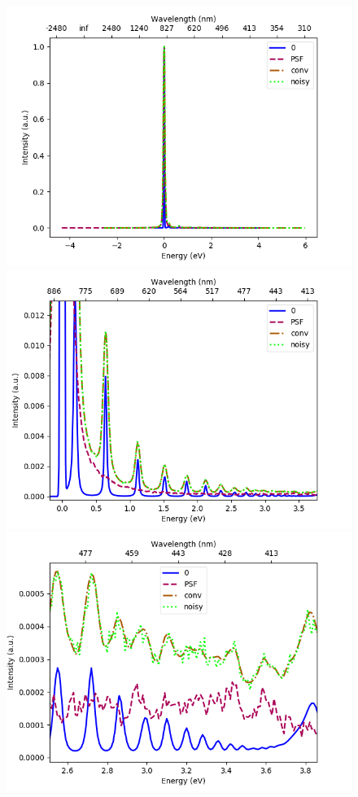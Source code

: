 \documentclass[12pt, titlepage]{article}
\begin{document}
\begin{figure}[h]
    \includegraphics[scale=0.4]{Reference_spectra.png}
    \includegraphics[scale=0.4]{Reference_spectra2.png}
    \includegraphics[scale=0.4]{Reference_spectra3.png}

\end{figure}
\end{document}
